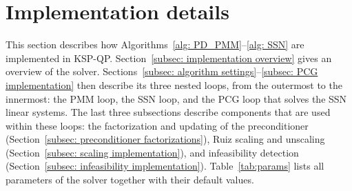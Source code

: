 %
%

\section{Implementation details} \label{sec: implementation details}

This section describes how Algorithms~\ref{alg: PD_PMM}--\ref{alg: SSN} are implemented in KSP-QP. Section~\ref{subsec: implementation overview} gives an overview of the solver. Sections~\ref{subsec: algorithm settings}--\ref{subsec: PCG implementation} then describe its three nested loops, from the outermost to the innermost: the PMM loop, the SSN loop, and the PCG loop that solves the SSN linear systems. The last three subsections describe components that are used within these loops: the factorization and updating of the preconditioner (Section~\ref{subsec: preconditioner factorizations}), Ruiz scaling and unscaling (Section~\ref{subsec: scaling implementation}), and infeasibility detection (Section~\ref{subsec: infeasibility implementation}). Table~\ref{tab:params} lists all parameters of the solver together with their default values.

